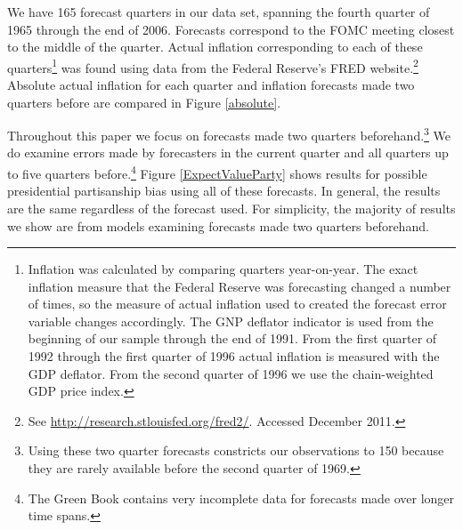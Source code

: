 \documentclass[a4paper]{article}\usepackage{graphicx, color}
\begin{document}
We have 165 forecast quarters in our data set, spanning the fourth quarter of 1965 through the end of 2006. Forecasts correspond to the FOMC meeting closest to the middle of the quarter. Actual inflation corresponding to each of these quarters\footnote{Inflation was calculated by comparing quarters year-on-year. The exact inflation measure that the Federal Reserve was forecasting changed a number of times, so the measure of actual inflation used to created the forecast error variable changes accordingly. The GNP deflator indicator is used from the beginning of our sample through the end of 1991. From the first quarter of 1992 through the first quarter of 1996 actual inflation is measured with the GDP deflator.  From the second quarter of 1996 we use the chain-weighted GDP price index.} was found using data from the Federal Reserve's FRED website.\footnote{See \url{http://research.stlouisfed.org/fred2/}. Accessed December 2011.} Absolute actual inflation for each quarter and inflation forecasts made two quarters before are compared in Figure \ref{absolute}. 

Throughout this paper we focus on forecasts made two quarters beforehand.\footnote{Using these two quarter forecasts constricts our observations to 150 because they are rarely available before the second quarter of 1969.} We do examine errors made by forecasters in the current quarter and all quarters up to five quarters before.\footnote{The Green Book contains very incomplete data for forecasts made over longer time spans.} Figure \ref{ExpectValueParty} shows results for possible presidential partisanship bias using all of these forecasts. In general, the results are the same regardless of the forecast used. For simplicity, the majority of results we show are from models examining forecasts made two quarters beforehand.
\end{document}
